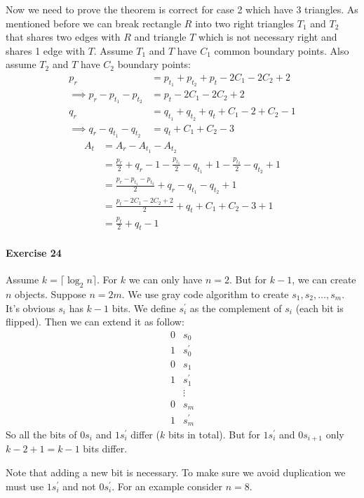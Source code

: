 \documentclass{book}
\begin{document}
	Now we need to prove the theorem is correct for case 2 which have 3 triangles. As mentioned before we can break rectangle $R$ into two right triangles $T_1$ and $T_2$ that shares two edges with $R$ and triangle $T$ which is not necessary right and shares 1 edge with $T$. Assume $T_1$ and $T$ have $C_1$ common boundary points. Also assume $T_2$ and $T$ have $C_2$ boundary points:
	\begin{equation*}
		\begin{split}
			p_r &= p_{t_1} + p_{t_2} + p_t - 2C_1 - 2C_2 + 2 \\
			\implies p_r - p_{t_1} - p_{t_2} &= p_t - 2C_1 - 2C_2 + 2 \\
			q_r &= q_{t_1} + q_{t_2} + q_t + C_1 - 2 + C_2 - 1 \\
			\implies q_r - q_{t_1} - q_{t_2} &= q_t + C_1 + C_2 - 3
		\end{split}
	\end{equation*}
	\begin{equation*}
		\begin{split}
			A_t &= A_r - A_{t_1} - A_{t_2} \\
			&= \frac{p_r}{2} + q_r - 1 - \frac{p_{t_1}}{2} - q_{t_1} + 1 - \frac{p_{t_2}}{2} - q_{t_2} + 1 \\
			&= \frac{p_r - p_{t_1} - p_{t_2}}{2} + q_r - q_{t_1} - q_{t_2} + 1 \\
			&= \frac{p_t - 2C_1 - 2C_2 + 2}{2} + q_t + C_1 + C_2 - 3 + 1 \\
			&= \frac{p_t}{2} + q_t - 1
		\end{split}
	\end{equation*}
	\paragraph{Exercise 24}
	Assume $k = \lceil \log_2 n \rceil$. For $k$ we can only have $n = 2$. But for $k - 1$, we can create $n$ objects. Suppose $n = 2m$. We use gray code algorithm to create $s_1, s_2, \dots, s_m$. It's obvious $s_i$ has $k - 1$ bits. We define $s_i^\prime$ as the complement of $s_i$ (each bit is flipped). Then we can extend it as follow:
	\begin{equation*}
		\begin{split}
			0&s_0\\
			1&s_0^\prime \\
			0&s_1\\
			1&s_1^\prime \\
			&\vdots \\
			0&s_m \\
			1&s_m^\prime
		\end{split}
	\end{equation*}
	So all the bits of $0s_i$ and $1s_i^\prime$ differ ($k$ bits in total). But for $1s_i^\prime$ and $0s_{i + 1}$ only $k - 2 + 1 = k - 1$ bits differ.
	\par Note that adding a new bit is necessary. To make sure we avoid duplication we must use $1s_i^\prime$ and not $0s_i^\prime$. For an example consider $n = 8$.
\end{document}

